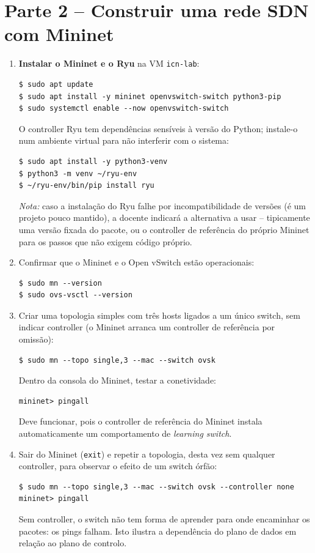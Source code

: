 \documentclass[11pt,a4paper]{article}
\begin{document}
\section{Parte 2 -- Construir uma rede SDN com Mininet}
\begin{enumerate}[label=\arabic*.,resume]

  \item \textbf{Instalar o Mininet e o Ryu} na VM \texttt{icn-lab}:
\begin{lstlisting}
$ sudo apt update
$ sudo apt install -y mininet openvswitch-switch python3-pip
$ sudo systemctl enable --now openvswitch-switch
\end{lstlisting}
  O controller Ryu tem dependências sensíveis à versão do Python; instale-o num ambiente virtual para não interferir com o sistema:
\begin{lstlisting}
$ sudo apt install -y python3-venv
$ python3 -m venv ~/ryu-env
$ ~/ryu-env/bin/pip install ryu
\end{lstlisting}
  \emph{Nota:} caso a instalação do Ryu falhe por incompatibilidade de versões (é um projeto pouco mantido), a docente indicará a alternativa a usar -- tipicamente uma versão fixada do pacote, ou o controller de referência do próprio Mininet para os passos que não exigem código próprio.

  \item Confirmar que o Mininet e o Open vSwitch estão operacionais:
\begin{lstlisting}
$ sudo mn --version
$ sudo ovs-vsctl --version
\end{lstlisting}

  \item Criar uma topologia simples com três hosts ligados a um único switch, sem indicar controller (o Mininet arranca um controller de referência por omissão):
\begin{lstlisting}
$ sudo mn --topo single,3 --mac --switch ovsk
\end{lstlisting}
  Dentro da consola do Mininet, testar a conetividade:
\begin{lstlisting}
mininet> pingall
\end{lstlisting}
  Deve funcionar, pois o controller de referência do Mininet instala automaticamente um comportamento de \emph{learning switch}.

  \item Sair do Mininet (\texttt{exit}) e repetir a topologia, desta vez sem qualquer controller, para observar o efeito de um switch órfão:
\begin{lstlisting}
$ sudo mn --topo single,3 --mac --switch ovsk --controller none
mininet> pingall
\end{lstlisting}
  Sem controller, o switch não tem forma de aprender para onde encaminhar os pacotes: os pings falham. Isto ilustra a dependência do plano de dados em relação ao plano de controlo.


\end{enumerate}
\end{document}
